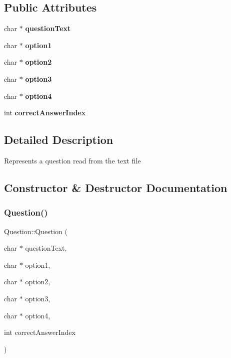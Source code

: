 \subsection*{Public Attributes}
\begin{DoxyCompactItemize}
\item 
\mbox{\label{class_question_acbc026e8d4f074a214207fd7dbf4a37e}} 
char $\ast$ {\bfseries question\+Text}
\item 
\mbox{\label{class_question_ae2f98827e7e6307319c8634617d421a5}} 
char $\ast$ {\bfseries option1}
\item 
\mbox{\label{class_question_a265203f8c3d5ebd644c12da8390342ee}} 
char $\ast$ {\bfseries option2}
\item 
\mbox{\label{class_question_af9773ef8fa00db5731c2124ada291664}} 
char $\ast$ {\bfseries option3}
\item 
\mbox{\label{class_question_a3e2dd1506b1a8edaafcbe211049bdf2b}} 
char $\ast$ {\bfseries option4}
\item 
\mbox{\label{class_question_a727b2913768a61852b9cf9dea9997537}} 
int {\bfseries correct\+Answer\+Index}
\end{DoxyCompactItemize}


\subsection{Detailed Description}
Represents a question read from the text file 

\subsection{Constructor \& Destructor Documentation}
\mbox{\label{class_question_a14d0ec4ad1baf10d081c5dae9fd893f1}} 
\subsubsection{\texorpdfstring{Question()}{Question()}}
{\footnotesize\ttfamily Question\+::\+Question (\begin{DoxyParamCaption}\item[{char $\ast$}]{question\+Text,  }\item[{char $\ast$}]{option1,  }\item[{char $\ast$}]{option2,  }\item[{char $\ast$}]{option3,  }\item[{char $\ast$}]{option4,  }\item[{int}]{correct\+Answer\+Index }\end{DoxyParamCaption})}

